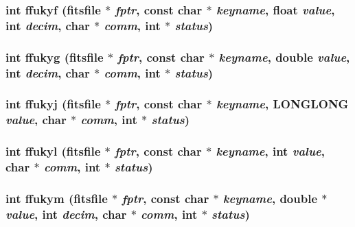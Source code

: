 \subsubsection{\setlength{\rightskip}{0pt plus 5cm}int ffukyf (\bf{fitsfile} $\ast$ {\em fptr}, const char $\ast$ {\em keyname}, float {\em value}, int {\em decim}, char $\ast$ {\em comm}, int $\ast$ {\em status})}\label{fitsio__64_8h_7e2a06ea877d0f925b262790562ddfee}


\subsubsection{\setlength{\rightskip}{0pt plus 5cm}int ffukyg (\bf{fitsfile} $\ast$ {\em fptr}, const char $\ast$ {\em keyname}, double {\em value}, int {\em decim}, char $\ast$ {\em comm}, int $\ast$ {\em status})}\label{fitsio__64_8h_5a1f266c010c12d806f4ce4798d09899}


\subsubsection{\setlength{\rightskip}{0pt plus 5cm}int ffukyj (\bf{fitsfile} $\ast$ {\em fptr}, const char $\ast$ {\em keyname}, \bf{LONGLONG} {\em value}, char $\ast$ {\em comm}, int $\ast$ {\em status})}\label{fitsio__64_8h_bafdc68a536acb7394eecdff9716469d}


\subsubsection{\setlength{\rightskip}{0pt plus 5cm}int ffukyl (\bf{fitsfile} $\ast$ {\em fptr}, const char $\ast$ {\em keyname}, int {\em value}, char $\ast$ {\em comm}, int $\ast$ {\em status})}\label{fitsio__64_8h_87a441e58e003c3ffe935433f47fe619}


\subsubsection{\setlength{\rightskip}{0pt plus 5cm}int ffukym (\bf{fitsfile} $\ast$ {\em fptr}, const char $\ast$ {\em keyname}, double $\ast$ {\em value}, int {\em decim}, char $\ast$ {\em comm}, int $\ast$ {\em status})}\label{fitsio__64_8h_7f9c7ad3634517428c532d6cb125197c}


